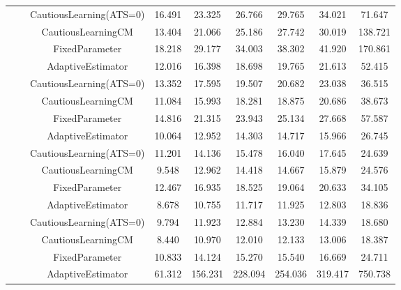 \begin{table}[!h]
\begin{tabular}[t]{ccccccccc}
 &  & CautiousLearning(ATS=0) & 16.491 & 23.325 & 26.766 & 29.765 & 34.021 & 71.647\\

 &  & CautiousLearningCM & 13.404 & 21.066 & 25.186 & 27.742 & 30.019 & 138.721\\

 & \multirow[t]{-4}{*}{\centering\arraybackslash 0.75} & FixedParameter & 18.218 & 29.177 & 34.003 & 38.302 & 41.920 & 170.861\\
\cmidrule{2-9}
 &  & AdaptiveEstimator & 12.016 & 16.398 & 18.698 & 19.765 & 21.613 & 52.415\\

 &  & CautiousLearning(ATS=0) & 13.352 & 17.595 & 19.507 & 20.682 & 23.038 & 36.515\\

 &  & CautiousLearningCM & 11.084 & 15.993 & 18.281 & 18.875 & 20.686 & 38.673\\

 & \multirow[t]{-4}{*}{\centering\arraybackslash 1.00} & FixedParameter & 14.816 & 21.315 & 23.943 & 25.134 & 27.668 & 57.587\\
\cmidrule{2-9}
 &  & AdaptiveEstimator & 10.064 & 12.952 & 14.303 & 14.717 & 15.966 & 26.745\\

 &  & CautiousLearning(ATS=0) & 11.201 & 14.136 & 15.478 & 16.040 & 17.645 & 24.639\\

 &  & CautiousLearningCM & 9.548 & 12.962 & 14.418 & 14.667 & 15.879 & 24.576\\

 & \multirow[t]{-4}{*}{\centering\arraybackslash 1.25} & FixedParameter & 12.467 & 16.935 & 18.525 & 19.064 & 20.633 & 34.105\\
\cmidrule{2-9}
 &  & AdaptiveEstimator & 8.678 & 10.755 & 11.717 & 11.925 & 12.803 & 18.836\\

 &  & CautiousLearning(ATS=0) & 9.794 & 11.923 & 12.884 & 13.230 & 14.339 & 18.680\\

 &  & CautiousLearningCM & 8.440 & 10.970 & 12.010 & 12.133 & 13.006 & 18.387\\

\multirow[t]{-28}{*}{\centering\arraybackslash 1} & \multirow[t]{-4}{*}{\centering\arraybackslash 1.50} & FixedParameter & 10.833 & 14.124 & 15.270 & 15.540 & 16.669 & 24.711\\
\cmidrule{1-9}
 &  & AdaptiveEstimator & 61.312 & 156.231 & 228.094 & 254.036 & 319.417 & 750.738\\


\end{tabular}
\end{table}
